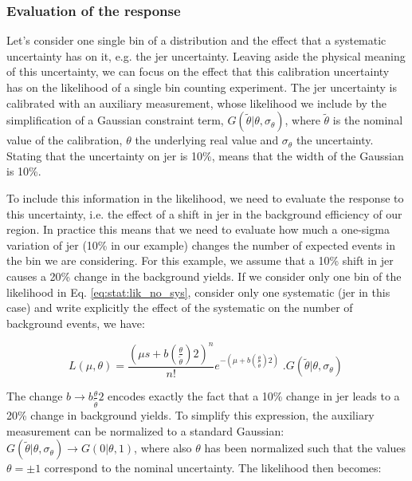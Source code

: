 \subsubsection*{Evaluation of the response}

Let’s consider one single bin of a distribution and the effect that a systematic uncertainty has on it, e.g. the \gls{jer} uncertainty. 
Leaving aside the physical meaning of this uncertainty, we can focus on the effect that this calibration uncertainty has on the likelihood of a single bin counting experiment. 
The \gls{jer} uncertainty is calibrated with an auxiliary measurement, whose likelihood we include by the simplification of a Gaussian constraint term, $G( \tilde{\theta} | \theta, \sigma_\theta)$, where $\tilde{\theta}$ is the nominal value of the calibration, $\theta$ the underlying real value and $\sigma_\theta$ the uncertainty. Stating that the uncertainty on \gls{jer} is 10\%, means that the width of the Gaussian is 10\%. 

To include this information in the likelihood, we need to evaluate the response to this uncertainty, i.e. the effect of a shift in \gls{jer} in the background efficiency of our region.
In practice this means that we need to evaluate how much a one-sigma variation of \gls{jer} (10\% in our example) changes the number of expected events in the bin we are considering. 
For this example, we assume that a 10\% shift in \gls{jer} causes a 20\% change in the background yields.
If we consider only one bin of the likelihood in Eq. \ref{eq:stat:lik_no_sys}, consider only one systematic (\gls{jer} in this case) and write explicitly the effect of the systematic on the number of background events, we have:

\begin{equation}
\label{eq:stat:lik_one_bin_sys_pre}
L(\mu, \theta) =
\frac{ (\mu s +
b \left( \frac{\theta}{\tilde{\theta}} \right) 2 )^{n} }{ n! }
e^{- (\mu  + b\left(\frac{\theta}{\tilde{\theta} }\right)2)}   \; .
G( \tilde{\theta} | \theta, \sigma_\theta) \ 
\end{equation}

\noindent The change $b \rightarrow b\frac{\theta}{\tilde{\theta} }2$ encodes exactly the fact that a 10\% change in \gls{jer} leads to a 20\% change in background yields. To simplify this expression, the auxiliary measurement can be normalized to a standard Gaussian: $G( \tilde{\theta} | \theta, \sigma_\theta) \rightarrow G( 0 | \theta, 1)$, where also $\theta$ has been normalized such that the values $\theta = \pm 1$ correspond to the nominal uncertainty. The likelihood then becomes:


